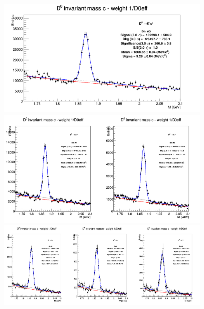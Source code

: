 \begin{figure}[!htp]
\centering
{\includegraphics[width=0.94\textwidth]{figures/Dzero/InvMassDistributions_Dzero_Bins3to3.png}}
{\includegraphics[width=0.94\textwidth]{figures/Dzero/InvMassDistributions_Dzero_Bins4to5.png}}
{\includegraphics[width=0.94\textwidth]{figures/Dzero/InvMassDistributions_Dzero_Bins6to8.png}}
\end{figure}
